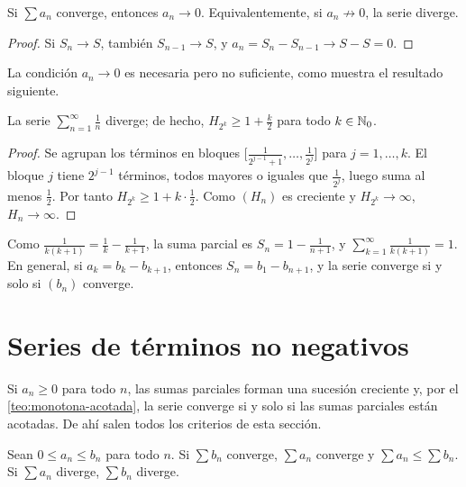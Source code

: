 \begin{proposicion}\label{prop:condicion-necesaria}
Si $\sum a_n$ converge, entonces $a_n\to0$. Equivalentemente, si $a_n\not\to0$, la serie diverge.
\end{proposicion}

\begin{proof}
Si $S_n\to S$, también $S_{n-1}\to S$, y $a_n=S_n-S_{n-1}\to S-S=0$.
\end{proof}

La condición $a_n\to0$ es necesaria pero no suficiente, como muestra el resultado siguiente.

\begin{teorema}\label{teo:armonica}
La serie $\sum_{n=1}^{\infty}\frac1n$ diverge; de hecho, $H_{2^{k}}\ge1+\frac k2$ para todo $k\in\mathbb{N}_0$.
\end{teorema}

\begin{proof}
Se agrupan los términos en bloques $\bigl[\frac{1}{2^{j-1}+1},\dots,\frac{1}{2^{j}}\bigr]$ para $j=1,\dots,k$. El bloque $j$ tiene $2^{j-1}$ términos, todos mayores o iguales que $\frac{1}{2^{j}}$, luego suma al menos $\frac12$. Por tanto $H_{2^{k}}\ge1+k\cdot\frac12$. Como $(H_n)$ es creciente y $H_{2^{k}}\to\infty$, $H_n\to\infty$.
\end{proof}

\begin{ejemplo}\label{ej:telescopica}
Como $\frac{1}{k(k+1)}=\frac1k-\frac{1}{k+1}$, la suma parcial es $S_n=1-\frac{1}{n+1}$, y $\sum_{k=1}^{\infty}\frac{1}{k(k+1)}=1$. En general, si $a_k=b_k-b_{k+1}$, entonces $S_n=b_1-b_{n+1}$, y la serie converge si y solo si $(b_n)$ converge.
\end{ejemplo}

\section{Series de términos no negativos}

Si $a_n\ge0$ para todo $n$, las sumas parciales forman una sucesión creciente y, por el \cref{teo:monotona-acotada}, la serie converge si y solo si las sumas parciales están acotadas. De ahí salen todos los criterios de esta sección.

\begin{teorema}\label{teo:comparacion-series}
Sean $0\le a_n\le b_n$ para todo $n$. Si $\sum b_n$ converge, $\sum a_n$ converge y $\sum a_n\le\sum b_n$. Si $\sum a_n$ diverge, $\sum b_n$ diverge.
\end{teorema}

